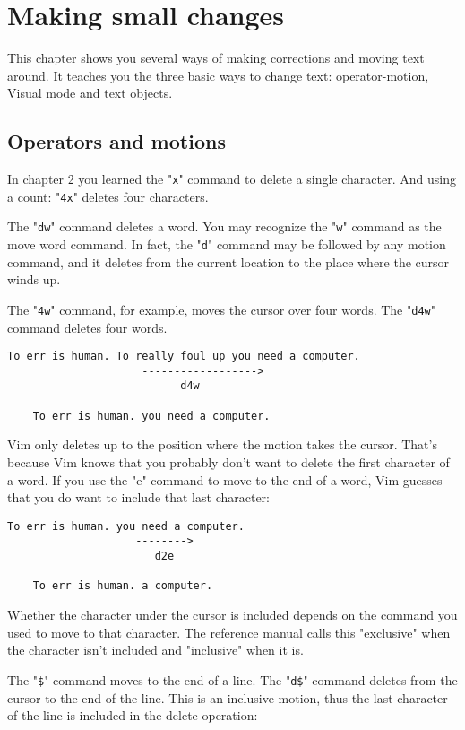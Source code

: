 \section{Making small changes}
This chapter shows you several ways of making corrections and moving text
around.  It teaches you the three basic ways to change text: operator-motion,
Visual mode and text objects.
\subsection{Operators and motions}

In chapter 2 you learned the "\verb!x!" command to delete a single character.
And using a count: "\verb!4x!" deletes four characters.

The "\verb!dw!" command deletes a word.
You may recognize the "\verb!w!" command as the move word command.
In fact, the "\verb!d!" command may be followed by any motion command, and it deletes from the current location to the place where the cursor winds up.

The "\verb!4w!" command, for example, moves the cursor over four words.
The "\verb!d4w!" command deletes four words.

\begin{Verbatim}[samepage=true]
    To err is human. To really foul up you need a computer. 
                     ------------------>
                           d4w

    To err is human. you need a computer. 
\end{Verbatim}

Vim only deletes up to the position where the motion takes the cursor.
That's because Vim knows that you probably don't want to delete the first character of a word.
If you use the "e" command to move to the end of a word, Vim guesses that you do want to include that last character:

\begin{Verbatim}[samepage=true]
    To err is human. you need a computer. 
                    -------->
                       d2e

    To err is human. a computer. 
\end{Verbatim}

Whether the character under the cursor is included depends on the command you used to move to that character.
The reference manual calls this "exclusive" when the character isn't included and "inclusive" when it is.

The "\verb!$!" command moves to the end of a line.
The "\verb!d$!" command deletes from the cursor to the end of the line.
This is an inclusive motion, thus the last character of the line is included in the delete operation:

